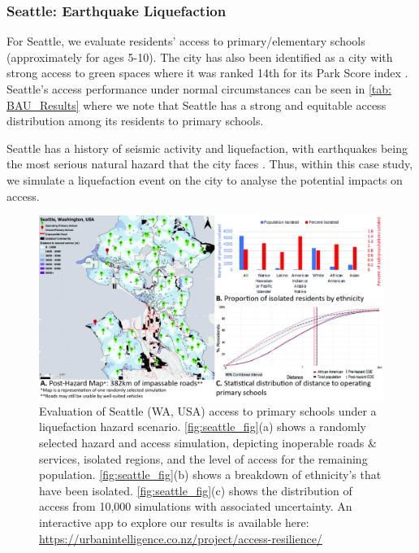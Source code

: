 \documentclass[review,3p,times,onecolumn,sort&compress,12pt]{elsarticle}
\let \cite \parencite
\begin{document}
\subsubsection{Seattle: Earthquake Liquefaction}
For Seattle, we evaluate residents' access to primary/elementary schools (approximately for ages 5-10).
The city has also been identified as a city with strong access to green spaces where it was ranked 14th for its Park Score index \cite{The_Trust_for_Public_Land2018-cm}.
Seattle's access performance under normal circumstances can be seen in \autoref{tab: BAU_Results} where we note that Seattle has a strong and equitable access distribution among its residents to primary schools.

Seattle has a history of seismic activity and liquefaction, with earthquakes being the most serious natural hazard that the city faces \cite{Seattle_Office_of_Emergency_Management2014-vt}.
Thus, within this case study, we simulate a liquefaction event on the city to analyse the potential impacts on access.

\begin{figure}[h]
    \includegraphics[width=1\linewidth]{report/fig/wa_fig.jpg}
    \caption{Evaluation of Seattle (WA, USA) access to primary schools under a liquefaction hazard scenario. \autoref{fig:seattle_fig}(a) shows a randomly selected hazard and access simulation, depicting inoperable roads \& services, isolated regions, and the level of access for the remaining population. \autoref{fig:seattle_fig}(b) shows a breakdown of ethnicity's that have been isolated. \autoref{fig:seattle_fig}(c) shows the distribution of access from 10,000 simulations with associated uncertainty. An interactive app to explore our results is available here: \url{https://urbanintelligence.co.nz/project/access-resilience/}}
    \label{fig:seattle_fig}
\end{figure}
\end{document}
